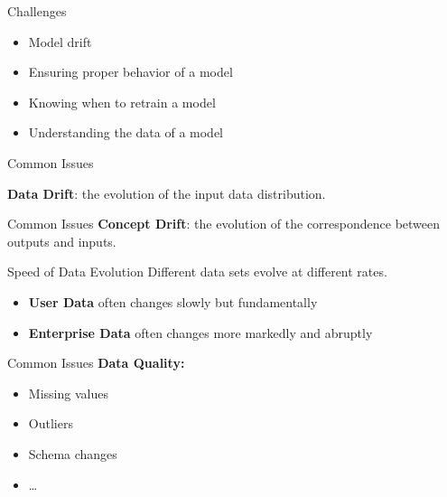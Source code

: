 
\begin{frame}{Challenges}
  \begin{itemize}
    \item Model drift
    \item Ensuring proper behavior of a model
    \item Knowing when to retrain a model
    \item Understanding the data of a model
  \end{itemize}

  \hugo
\end{frame}


\begin{frame}{Common Issues}

  \textbf{Data Drift}: the evolution of the input data distribution.


  \hugo
\end{frame}


\begin{frame}{Common Issues}
  \textbf{Concept Drift}: the evolution of the correspondence between
  outputs and inputs.


  \hugo
\end{frame}


\begin{frame}{Speed of Data Evolution}
  Different data sets evolve at different rates.

  \begin{itemize}
    \item \textbf{User Data} often changes slowly but fundamentally
    \item \textbf{Enterprise Data} often changes more markedly and abruptly
  \end{itemize}

  \hugo
\end{frame}


\begin{frame}{Common Issues}
  \textbf{Data Quality:}

  \begin{itemize}
    \item Missing values
    \item Outliers
    \item Schema changes
    \item \dots
  \end{itemize}

  \hugo
\end{frame}


